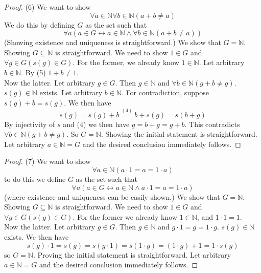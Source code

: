 \documentclass{report}
\begin{document}
\begin{proof}(6)
We want to show
\begin{equation*}
\forall a\in\mathbb N\forall b\in\mathbb N(a+b\neq a)
\end{equation*}
We do this by defining $G$ as the set such that
\begin{equation*}
\forall a(a\in G\leftrightarrow a\in\mathbb N\land\forall b\in\mathbb N(a+b\neq a))
\end{equation*}
(Showing existence and uniqueness is straightforward.) We show that $G=\mathbb N$.
Showing $G\subseteq\mathbb N$ is straightforward. We need to show $1\in G$ and $\forall g\in G(s(g)\in G)$. For the former, we already know $1\in\mathbb N$. Let arbitrary $b\in\mathbb N$.
By (5) $1+b\neq 1$.\\
\indent Now the latter. Let arbitrary $g\in G$. Then $g\in\mathbb N$ and $\forall b\in\mathbb N(g+b\neq g)$. $s(g)\in\mathbb N$ exists. Let arbitrary $b\in\mathbb N$.
For contradiction, suppose $s(g)+b=s(g)$. We then have
\begin{equation*}
s(g)=s(g)+b\overset{(4)}{=}b+s(g)=s(b+g)
\end{equation*}
By injectivity of $s$ and (4) we then have $g=b+g=g+b$. This contradicts $\forall b\in\mathbb N(g+b\neq g)$.
So $G=\mathbb N$. Showing the initial statement is straightforward. Let arbitrary $a\in\mathbb N=G$ and the desired conclusion immediately follows.
\end{proof}
\begin{proof}(7)
We want to show
\begin{equation*}
\forall a\in\mathbb N(a\cdot1=a=1\cdot a)
\end{equation*}
to do this we define $G$ as the set such that
\begin{equation*}
\forall a(a\in G\leftrightarrow a\in\mathbb N\land a\cdot1=a=1\cdot a)
\end{equation*}
(where existence and uniqueness can be easily shown.) We show that $G=\mathbb N$.
Showing $G\subseteq\mathbb N$ is straightforward. We need to show $1\in G$ and $\forall g\in G(s(g)\in G)$. For the former we already know $1\in\mathbb N$, and $1\cdot1=1$.\\
\indent Now the latter. Let arbitrary $g\in G$. Then $g\in\mathbb N$ and $g\cdot1=g=1\cdot g$. 
$s(g)\in\mathbb N$ exists. We then have
\begin{equation*}
s(g)\cdot1=s(g)=s(g\cdot1)=s(1\cdot g)=(1\cdot g)+1=1\cdot s(g)
\end{equation*}
so $G=\mathbb N$. Proving the initial statement is straightforward. Let arbitrary $a\in\mathbb N=G$
and the desired conclusion immediately follows.
\end{proof}
\end{document}
